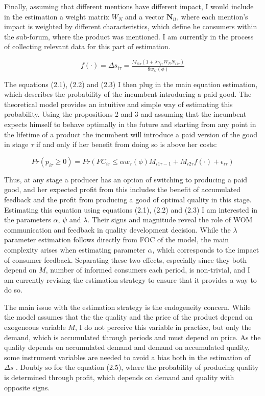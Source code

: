 \documentclass[13pt]{article}
\numberwithin{figure}{section}
\numberwithin{table}{section}
\theoremstyle{indented}
\numberwithin{equation}{section} %
\begin{document}
Finally, assuming that different mentions have different impact, I would include in the estimation a weight matrix $W_N$ and a vector $\textbf{N}_{it}$, where each mention's impact is weighted by different characteristics, which define he consumers within the sub-forum, where the product was mentioned. I am currently in the process of collecting relevant data for this part of estimation.

\begin{equation}
f(\cdot) = \Delta s_{i\tau} = \tfrac{M_{i1\tau}(1+\lambda\gamma_{i\tau} W_NN_{i1\tau})}{8w_{i\tau}(\phi)} 
\end{equation}

The equations (2.1), (2.2) and (2.3) I then plug in the main equation estimation, which describes the probability of the incumbent introducing a paid good. The theoretical model provides an intuitive and simple way of estimating this probability. Using the propositions 2 and 3 and assuming that the incumbent expects himself to behave optimally in the future and starting from any point in the lifetime of a product the incumbent will introduce a paid version of the good in stage $\tau$ if and only if her benefit from doing so is above her costs:

\begin{equation}
Pr(p_{i\tau}\geq 0) = Pr(FC_{i\tau} \leq \alpha w_{\tau}(\phi)M_{i1\tau-1 }  + M_{i2\tau}f(\cdot) + \epsilon_{i\tau}  )
\end{equation}


Thus, at any stage a producer has an option of switching to producing a paid good, and her expected profit from this includes the benefit of accumulated feedback and the profit from producing a good of optimal quality in this stage. Estimating this equation using equations (2.1), (2.2) and (2.3) I am interested in the parameters $\alpha$, \textbf{$\psi$} and $\lambda$. Their signs and magnitude reveal the role of WOM communication and feedback in quality development decision. While the $\lambda$ parameter estimation follows directly from FOC of the model, the main complexity arises when estimating parameter $\alpha$, which corresponds to the impact of consumer feedback. Separating these two effects, especially since they both depend on $M$, number of informed consumers each period, is non-trivial, and I am currently revising the estimation strategy to ensure that it provides a way to do so. 

The main issue with the estimation strategy is the endogeneity concern. While the model assumes that the the quality and the price of the product depend on exogeneous variable $M$, I do not perceive this variable in practice, but only the demand, which is accumulated through periods and must depend on price. As the quality depends on accumulated demand and demand on accumulated quality, some instrument variables are needed to avoid a bias both in the estimation of $\Delta s$ . Doubly so for the equation (2.5), where the probability of producing quality is determined through profit, which depends on demand and quality with opposite signs. 
\end{document}
